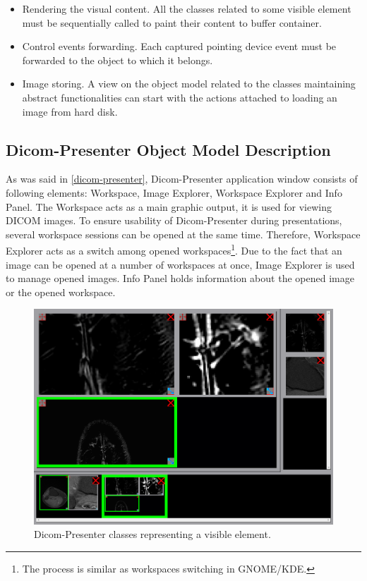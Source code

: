 \begin{itemize}
\item Rendering the visual content. All the classes related to some visible element must be sequentially called to paint their content to buffer container.
\item Control events forwarding. Each captured pointing device event must be forwarded to the object to which it belongs.
\item Image storing. A view on the object model related to the classes maintaining abstract functionalities can start with the actions attached to loading an image from hard disk.
\end{itemize}

\subsection{Dicom-Presenter Object Model Description}
As was said in \ref{dicom-presenter}, Dicom-Presenter application window consists of following elements:  Workspace, Image Explorer, Workspace Explorer and Info Panel. The Workspace acts as a main graphic output, it is used for viewing DICOM images. To ensure usability of Dicom-Presenter during presentations, several workspace sessions can be opened at the same time. Therefore, Workspace Explorer acts as a switch among opened workspaces\footnote{The process is similar as workspaces switching in GNOME/KDE.}. Due to the fact that an image can be opened at a number of workspaces at once, Image Explorer is used to manage opened images. Info Panel holds information about the opened image or the opened workspace.

\begin{figure}
	\caption{Dicom-Presenter classes representing a visible element.}
	\begin{center}
	\includegraphics[width=\textwidth]{Text/IMG/dicom-presenter-gui.png}
	\end{center}
	\label{paint}
\end{figure}


